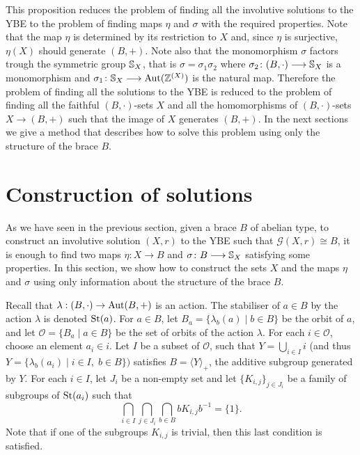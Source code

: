 This proposition  reduces the problem of finding all the involutive solutions
to the YBE to the problem of finding   maps $\eta$ and $\sigma$ with
the required properties. Note that the map $\eta$ is determined by
its restriction to $X$ and, since $\eta$ is surjective, $\eta(X)$
should generate $(B,+)$. Note also that the monomorphism $\sigma$
factors trough the symmetric group $\mathbb{S}_X$, that is
$\sigma=\sigma_1\sigma_2$ where $\sigma_2\colon
(B,\cdot)\longrightarrow \mathbb{S}_X$ is a monomorphism and
$\sigma_1\colon \mathbb{S}_X\longrightarrow \operatorname{Aut}(\mathbb{Z}^{(X)})$ is the
natural map. Therefore the problem of finding all the solutions to
the YBE is reduced to the problem of finding all the faithful
$(B,\cdot)$-sets $X$ and all the homomorphisms of $(B,\cdot)$-sets
$X\longrightarrow (B,+)$ such that the image of $X$ generates
$(B,+)$. In the next sections we give a method that describes how to
solve this problem using only  the structure of the brace $B$.



\section{Construction of solutions}\label{sec3}
As we have seen in the previous section, given a brace $B$ of abelian type, to
construct an involutive solution $(X,r)$ to the YBE such that
$\mathcal{G}(X,r)\cong B$, it is enough to find two  maps
$\eta\colon X\longrightarrow B$ and $\sigma\colon B\longrightarrow
\mathbb{S}_X$ satisfying some properties. In this section, we show how to
construct the sets $X$ and the maps $\eta$ and $\sigma$ using only
information about the structure of the brace $B$.

Recall that $\lambda : (B,\cdot ) \rightarrow \operatorname{Aut}(B,+)$ is an
action. The stabiliser of $a\in B$ by the action $\lambda$ is
denoted $\operatorname{St}(a)$. For $a\in B$, let $B_a=\{\lambda_b(a)\mid b\in
B\}$ be the orbit of $a$, and let $\mathcal{O}=\{ B_a\mid a\in B\}$
be the set of orbits of the action $\lambda$.  For each $i\in
\mathcal{O}$, choose an element $a_i\in i$. Let $I$ be a subset of
$\mathcal{O}$, such that $Y=\bigcup_{i\in I}i$  (and thus
$Y=\{\lambda_b(a_i)\mid i\in I,\; b\in B\} )$
satisfies $B=\langle
Y\rangle_+$, the additive subgroup generated by $Y$. For each $i\in
I$, let $J_i$ be a non-empty set and  let $\{ K_{i,j} \}_{j\in J_i}$
be a family of subgroups of $\operatorname{St}(a_i)$ such that
$$\bigcap_{i\in I}\bigcap_{j\in J_i}\bigcap_{b\in B}bK_{i,j}b^{-1}=\{ 1\}.$$
Note that if one of the subgroups $K_{i,j}$ is trivial, then this
last condition is satisfied.



